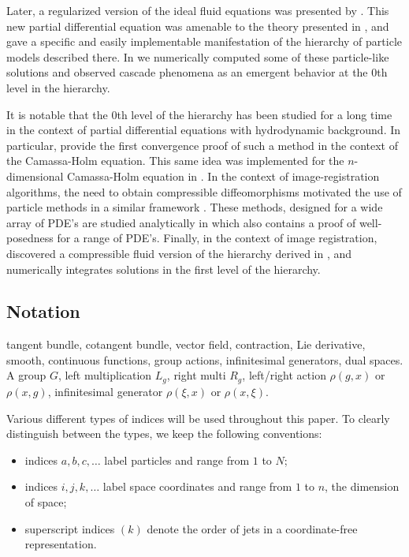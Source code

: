 \documentclass[12pt]{amsart}
\begin{document}
 Later, a regularized version of the ideal fluid equations was presented by
 \cite{MumfordMichor2013}.
 This new partial differential equation was amenable to the theory presented in 
 \cite{JacobsRatiuDesbrun2013}, and gave a specific and easily
 implementable manifestation of the hierarchy of particle models
 described there.
 In \cite{CotterHolmJacobsMeier2014} we numerically computed some
 of these particle-like solutions and observed cascade phenomena as
 an emergent behavior at the $0$th level in the hierarchy.

 It is notable that the $0$th level of the hierarchy has been studied
 for a long time in the context of partial differential equations with hydrodynamic background.
 In particular, \cite{HoldenRaynaud2006} provide the first convergence proof of such a method in the context of the Camassa-Holm equation.
 This same idea was implemented for the $n$-dimensional Camassa-Holm
 equation in \cite{ChertockDuToitMarsden2012}.
 In the context of image-registration algorithms, the need to obtain 
 compressible diffeomorphisms motivated the use of particle methods
 in a similar framework \cite{JoshiMiller2000}.
 These methods, designed for a wide array of PDE's are studied analytically
 in \cite{TrouveYounes2005} which also contains a proof of well-posedness
 for a range of PDE's.
 Finally, in the context of image registration, \cite{Sommer2013} 
 discovered a compressible fluid version of the hierarchy derived in \cite{JacobsRatiuDesbrun2013},
 and numerically integrates solutions in the first level of the hierarchy.

\subsection{Notation}
tangent bundle, cotangent bundle, vector field, contraction, Lie derivative,
smooth, continuous functions, group actions, infinitesimal generators,
dual spaces.  A group $G$, left multiplication $L_g$, right multi $R_g$, 
left/right action $\rho(g,x)$ or $\rho(x,g)$, infinitesimal generator $\rho(\xi,x)$ or $\rho(x,\xi)$.

Various different types of indices will be used throughout this paper.
To clearly distinguish between the types, we keep the following
conventions:
\begin{itemize}
\item indices $a,b,c,\ldots$ label particles and range from $1$ to $N$;
\item indices $i,j,k,\ldots$ label space coordinates and range from
  $1$ to $n$, the dimension of space;
\item superscript indices $(k)$ denote the order of jets in a
  coordinate-free representation.
\end{itemize}
\end{document}
